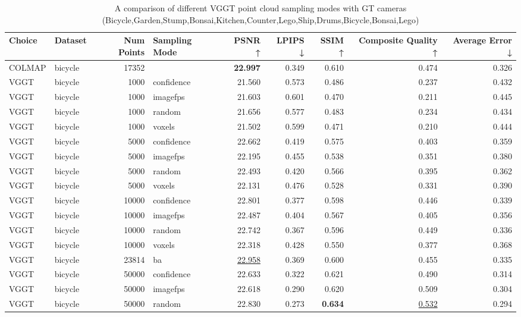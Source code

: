\begin{table}[H]
\caption{A comparison of different VGGT point cloud sampling modes with GT cameras (Bicycle,Garden,Stump,Bonsai,Kitchen,Counter,Lego,Ship,Drums,Bicycle,Bonsai,Lego)}
\label{tab:03_sampling_mode_gt_cams_bicycle,garden,stump,bonsai,kitchen,counter,lego,ship,drums,bicycle,bonsai,lego}
\small
\begin{tabular}{llrlrrrrr}
\toprule
Choice & Dataset & Num Points & Sampling Mode & PSNR ↑ & LPIPS ↓ & SSIM ↑ & Composite Quality ↑ & Average Error ↓ \\
\midrule
COLMAP & bicycle & 17352 &  & \textbf{22.997} & 0.349 & 0.610 & 0.474 & 0.326 \\
VGGT & bicycle & 1000 & confidence & 21.560 & 0.573 & 0.486 & 0.237 & 0.432 \\
VGGT & bicycle & 1000 & imagefps & 21.603 & 0.601 & 0.470 & 0.211 & 0.445 \\
VGGT & bicycle & 1000 & random & 21.656 & 0.577 & 0.483 & 0.234 & 0.434 \\
VGGT & bicycle & 1000 & voxels & 21.502 & 0.599 & 0.471 & 0.210 & 0.444 \\
VGGT & bicycle & 5000 & confidence & 22.662 & 0.419 & 0.575 & 0.403 & 0.359 \\
VGGT & bicycle & 5000 & imagefps & 22.195 & 0.455 & 0.538 & 0.351 & 0.380 \\
VGGT & bicycle & 5000 & random & 22.493 & 0.420 & 0.566 & 0.395 & 0.362 \\
VGGT & bicycle & 5000 & voxels & 22.131 & 0.476 & 0.528 & 0.331 & 0.390 \\
VGGT & bicycle & 10000 & confidence & 22.801 & 0.377 & 0.598 & 0.446 & 0.339 \\
VGGT & bicycle & 10000 & imagefps & 22.487 & 0.404 & 0.567 & 0.405 & 0.356 \\
VGGT & bicycle & 10000 & random & 22.742 & 0.367 & 0.596 & 0.449 & 0.336 \\
VGGT & bicycle & 10000 & voxels & 22.318 & 0.428 & 0.550 & 0.377 & 0.368 \\
VGGT & bicycle & 23814 & ba & \underline{22.958} & 0.369 & 0.600 & 0.455 & 0.335 \\
VGGT & bicycle & 50000 & confidence & 22.633 & 0.322 & 0.621 & 0.490 & 0.314 \\
VGGT & bicycle & 50000 & imagefps & 22.618 & 0.290 & 0.620 & 0.509 & 0.304 \\
VGGT & bicycle & 50000 & random & 22.830 & 0.273 & \textbf{0.634} & \underline{0.532} & 0.294 \\

\end{tabular}
\end{table}
